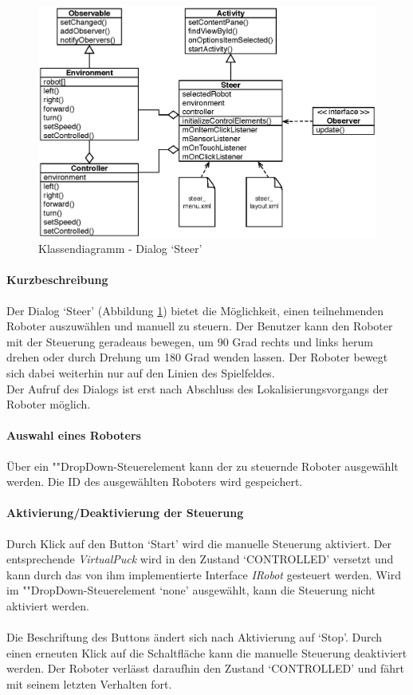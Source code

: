 \documentclass[10pt,a4paper]{article}
\begin{document}
	\begin{figure}[h]
			\centering
			\includegraphics[width=14cm]{images/entwurf_steer.eps}
  			\caption{Klassendiagramm - Dialog `Steer'}
  			\label{fig:dialog_steer}
  	\end{figure}
	
	\paragraph*{Kurzbeschreibung}
	Der Dialog `Steer' (Abbildung \ref{fig:dialog_steer}) bietet die Möglichkeit, einen teilnehmenden Roboter auszuwählen und manuell zu steuern. Der 
	Benutzer kann den Roboter mit der 
	Steuerung geradeaus bewegen, um 90 Grad rechts und links herum drehen oder durch Drehung um 180 Grad wenden lassen. Der Roboter bewegt sich dabei
	weiterhin nur auf den Linien des Spielfeldes. \\
	Der Aufruf des Dialogs ist erst nach Abschluss des Lokalisierungsvorgangs der Roboter möglich.
	
	\paragraph*{Auswahl eines Roboters}
	Über ein ""Drop\-Down-Steu\-er\-ele\-ment kann der zu steuernde Roboter ausgewählt werden. Die ID des ausgewählten Roboters wird gespeichert.
	
	\paragraph*{Aktivierung/Deaktivierung der Steuerung} Durch Klick auf den Button `Start' wird die manuelle Steuerung aktiviert. Der entsprechende
	\textit{VirtualPuck} wird in den Zustand `CONTROLLED' versetzt und kann durch das von ihm implementierte Interface \textit{IRobot} gesteuert werden.
	Wird im ""Drop\-Down-Steu\-er\-ele\-ment `none' ausgewählt, kann die Steuerung nicht aktiviert werden. \\ \\
	Die Beschriftung des Buttons ändert sich nach Aktivierung auf `Stop'. Durch einen erneuten Klick auf die Schaltfläche kann die manuelle Steuerung
	deaktiviert werden. Der Roboter verlässt daraufhin den Zustand `CONTROLLED' und fährt mit seinem letzten Verhalten fort.
	
\end{document}
